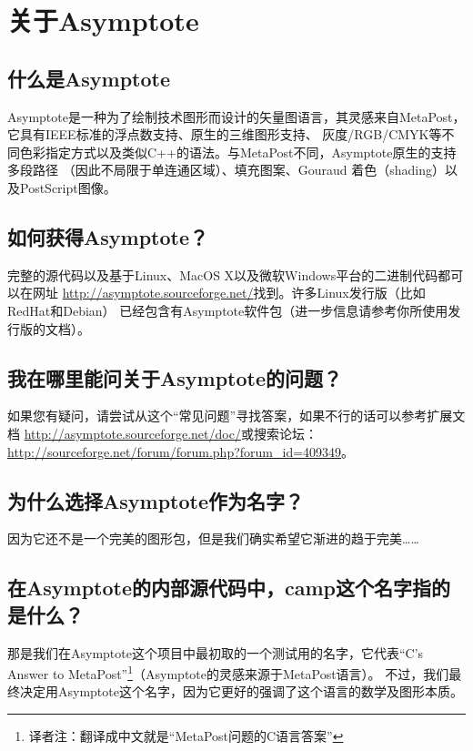 \section{\label{Q1}关于Asymptote}
\subsection{\label{Q1.1}什么是Asymptote}
Asymptote是一种为了绘制技术图形而设计的矢量图语言，其灵感来自MetaPost，它具有IEEE标准的浮点数支持、原生的三维图形支持、
灰度/RGB/CMYK等不同色彩指定方式以及类似C++的语法。与MetaPost不同，Asymptote原生的支持多段路径
（因此不局限于单连通区域）、填充图案、Gouraud 着色（shading）以及PostScript图像。

\subsection{\label{Q1.2}如何获得Asymptote？}
完整的源代码以及基于Linux、MacOS X以及微软Windows平台的二进制代码都可以在网址
\url{http://asymptote.sourceforge.net/}找到。许多Linux发行版（比如RedHat和Debian）
已经包含有Asymptote软件包（进一步信息请参考你所使用发行版的文档）。

\subsection{\label{Q1.3}我在哪里能问关于Asymptote的问题？}
如果您有疑问，请尝试从这个“常见问题”寻找答案，如果不行的话可以参考扩展文档
\url{http://asymptote.sourceforge.net/doc/}或搜索论坛：
\url{http://sourceforge.net/forum/forum.php?forum_id=409349}。

\subsection{\label{Q1.4}为什么选择Asymptote\protect\footnotemark 作为名字？}
因为它还不是一个完美的图形包，但是我们确实希望它渐进的趋于完美……

\subsection{\label{Q1.5}在Asymptote的内部源代码中，camp这个名字指的是什么？}
那是我们在Asymptote这个项目中最初取的一个测试用的名字，它代表“C's Answer to MetaPost”\footnote{%
译者注：翻译成中文就是“MetaPost问题的C语言答案”}（Asymptote的灵感来源于MetaPost语言）。
不过，我们最终决定用Asymptote这个名字，因为它更好的强调了这个语言的数学及图形本质。

